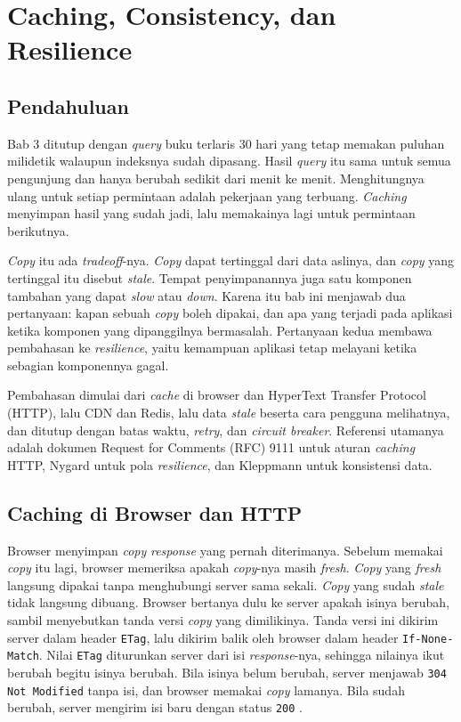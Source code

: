 \chapter{Caching, Consistency, dan Resilience}
\label{ch:caching}

\section{Pendahuluan}

Bab 3 ditutup dengan \textit{query} buku terlaris 30 hari yang tetap memakan puluhan
milidetik walaupun indeksnya sudah dipasang. Hasil \textit{query} itu sama untuk semua
pengunjung dan hanya berubah sedikit dari menit ke menit. Menghitungnya ulang
untuk setiap permintaan adalah pekerjaan yang terbuang. \textit{Caching}
menyimpan hasil yang sudah jadi, lalu memakainya lagi untuk permintaan
berikutnya.

\textit{Copy} itu ada \textit{tradeoff}-nya. \textit{Copy} dapat tertinggal dari data aslinya, dan
\textit{copy} yang tertinggal itu disebut \textit{stale}. Tempat penyimpanannya juga satu
komponen tambahan yang dapat \textit{slow} atau \textit{down}. Karena itu bab ini menjawab dua
pertanyaan: kapan sebuah \textit{copy} boleh dipakai, dan apa yang terjadi pada
aplikasi ketika komponen yang dipanggilnya bermasalah. Pertanyaan kedua
membawa pembahasan ke \textit{resilience}, yaitu kemampuan aplikasi tetap
melayani ketika sebagian komponennya gagal.

Pembahasan dimulai dari \textit{cache} di browser dan HyperText Transfer
Protocol (HTTP), lalu CDN dan Redis, lalu data \textit{stale} beserta cara pengguna
melihatnya, dan ditutup dengan batas waktu, \textit{retry}, dan \textit{circuit
breaker}. Referensi utamanya adalah dokumen Request for Comments (RFC) 9111
\cite{rfc9111} untuk aturan \textit{caching} HTTP, Nygard
\cite{nygard2018releaseit} untuk pola \textit{resilience}, dan Kleppmann
\cite{kleppmann2017ddia} untuk konsistensi data.

\section{Caching di Browser dan HTTP}
\label{sec:cache-http}

Browser menyimpan \textit{copy} \textit{response} yang pernah diterimanya. Sebelum memakai
\textit{copy} itu lagi, browser memeriksa apakah \textit{copy}-nya masih \textit{fresh}. \textit{Copy}
yang \textit{fresh} langsung dipakai tanpa menghubungi server sama sekali. \textit{Copy} yang
sudah \textit{stale} tidak langsung dibuang. Browser bertanya dulu ke server apakah isinya
berubah, sambil menyebutkan tanda versi \textit{copy} yang dimilikinya. Tanda versi
ini dikirim server dalam header \texttt{ETag}, lalu dikirim balik oleh browser
dalam header \texttt{If-None-Match}. Nilai \texttt{ETag} diturunkan server dari
isi \textit{response}-nya, sehingga nilainya ikut berubah begitu isinya berubah. Bila isinya belum berubah, server menjawab
\texttt{304 Not Modified} tanpa isi, dan browser memakai \textit{copy} lamanya. Bila
sudah berubah, server mengirim isi baru dengan status \texttt{200}
\cite{rfc9111}.

